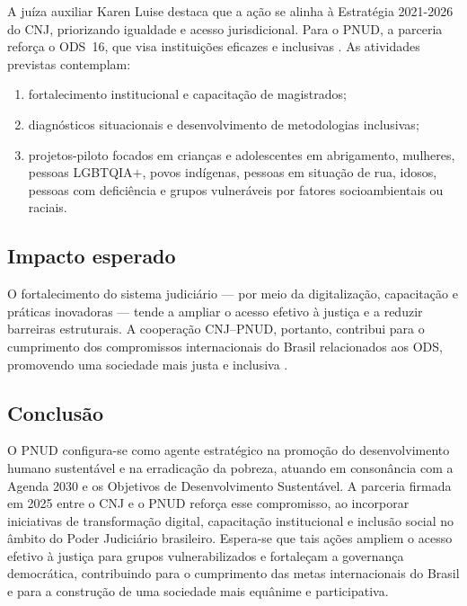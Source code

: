 A juíza auxiliar Karen Luise destaca que a ação se alinha à Estratégia 2021-2026
do CNJ, priorizando igualdade e acesso jurisdicional. Para o PNUD, a parceria
reforça o ODS~16, que visa instituições eficazes e inclusivas
\cite{undp2025pnudcnj}. As atividades previstas contemplam:
\begin{enumerate}
  \item fortalecimento institucional e capacitação de magistrados;
  \item diagnósticos situacionais e desenvolvimento de metodologias inclusivas;
  \item projetos-piloto focados em crianças e adolescentes em abrigamento,
        mulheres, pessoas LGBTQIA$+$, povos indígenas, pessoas em situação de
        rua, idosos, pessoas com deficiência e grupos vulneráveis por fatores
        socioambientais ou raciais.
\end{enumerate}

\subsection*{Impacto esperado}
O fortalecimento do sistema judiciário — por meio da digitalização,
capacitação e práticas inovadoras — tende a ampliar o acesso efetivo à justiça e
a reduzir barreiras estruturais. A cooperação CNJ–PNUD, portanto, contribui para
o cumprimento dos compromissos internacionais do Brasil relacionados aos ODS,
promovendo uma sociedade mais justa e inclusiva
\cite{undp2025pnudcnj}.

\subsection{Conclusão}
O PNUD configura-se como agente estratégico na promoção do desenvolvimento humano sustentável e na erradicação da pobreza, atuando em consonância com a Agenda 2030 e os Objetivos de Desenvolvimento Sustentável. A parceria firmada em 2025 entre o CNJ e o PNUD reforça esse compromisso, ao incorporar iniciativas de transformação digital, capacitação institucional e inclusão social no âmbito do Poder Judiciário brasileiro. Espera-se que tais ações ampliem o acesso efetivo à justiça para grupos vulnerabilizados e fortaleçam a governança democrática, contribuindo para o cumprimento das metas internacionais do Brasil e para a construção de uma sociedade mais equânime e participativa.




